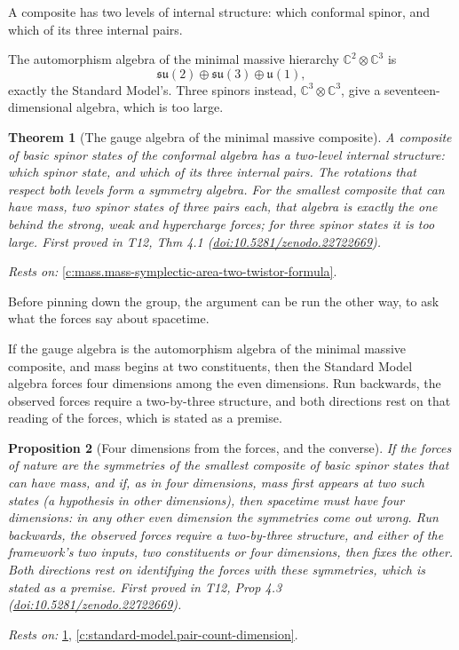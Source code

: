 \documentclass[11pt]{article}
\newtheorem{theorem}{Theorem}[section]
\newtheorem{proposition}[theorem]{Proposition}
\theoremstyle{definition}
\theoremstyle{plain}
\providecommand{\C}{}\renewcommand{\C}{\mathbb{C}}
\providecommand{\su}{}\renewcommand{\su}{\mathfrak{su}}
\providecommand{\uu}{}\renewcommand{\uu}{\mathfrak{u}}
\begin{document}
A composite has two levels of internal structure: which conformal spinor, and which of its three internal pairs.

The automorphism algebra of the minimal massive hierarchy $\C^{2} \otimes \C^{3}$ is \[ \su(2) \oplus \su(3) \oplus \uu(1), \] exactly the Standard Model's. Three spinors instead, $\C^{3} \otimes \C^{3}$, give a seventeen-dimensional algebra, which is too large.

\begin{theorem}[The gauge algebra of the minimal massive composite]\label{c:standard-model.gauge-algebra-minimal-massive-composite}
A composite of basic spinor states of the conformal algebra has a two-level internal structure: which spinor state, and which of its three internal pairs. The rotations that respect both levels form a symmetry algebra. For the smallest composite that can have mass, two spinor states of three pairs each, that algebra is exactly the one behind the strong, weak and hypercharge forces; for three spinor states it is too large.
\emph{First proved in} T12, Thm 4.1 (\href{https://doi.org/10.5281/zenodo.22722669}{doi:10.5281/zenodo.22722669}).
\end{theorem}
\noindent\emph{Rests on:} \ref{c:mass.mass-symplectic-area-two-twistor-formula}.

Before pinning down the group, the argument can be run the other way, to ask what the forces say about spacetime.

If the gauge algebra is the automorphism algebra of the minimal massive composite, and mass begins at two constituents, then the Standard Model algebra forces four dimensions among the even dimensions. Run backwards, the observed forces require a two-by-three structure, and both directions rest on that reading of the forces, which is stated as a premise.

\begin{proposition}[Four dimensions from the forces, and the converse]\label{c:standard-model.four-dimensions-forces-converse}
If the forces of nature are the symmetries of the smallest composite of basic spinor states that can have mass, and if, as in four dimensions, mass first appears at two such states (a hypothesis in other dimensions), then spacetime must have four dimensions: in any other even dimension the symmetries come out wrong. Run backwards, the observed forces require a two-by-three structure, and either of the framework's two inputs, two constituents or four dimensions, then fixes the other. Both directions rest on identifying the forces with these symmetries, which is stated as a premise.
\emph{First proved in} T12, Prop 4.3 (\href{https://doi.org/10.5281/zenodo.22722669}{doi:10.5281/zenodo.22722669}).
\end{proposition}
\noindent\emph{Rests on:} \ref{c:standard-model.gauge-algebra-minimal-massive-composite}, \ref{c:standard-model.pair-count-dimension}.
\end{document}
